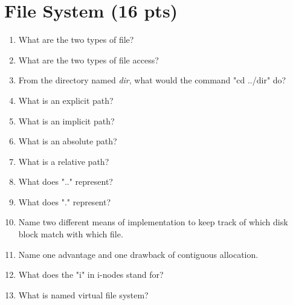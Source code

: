 \documentclass[11pt]{article}
\begin{document}
\section{File System (16 pts)}
	\begin{enumerate}
		\item What are the two types of file? %
		\vspace{1cm}
		\item What are the two types of file access? %
		\vspace{1cm}
		\item From the directory named \emph{dir}, what would the command "cd ../dir" do? %
		\vspace{1cm}
		\item What is an explicit path? %
		\vspace{1cm}
		\item What is an implicit path? %
		\vspace{1cm}
		\item What is an absolute path? %
		\vspace{1cm}
		\item What is a relative path? %
		\vspace{1cm}
		\item What does ".." represent? %
		\vspace{1cm}
		\item What does "." represent? %
		\vspace{1cm}
		\item Name two different means of implementation to keep track of which disk block match with which file. %
		\vspace{1cm}
		\item Name one advantage and one drawback of contiguous allocation. %
		\vspace{1cm}
		\item What does the "i" in i-nodes stand for? %
		\vspace{1cm}
		\item What is named virtual file system? %
		\vspace{1cm}
	\end{enumerate}
\end{document}
